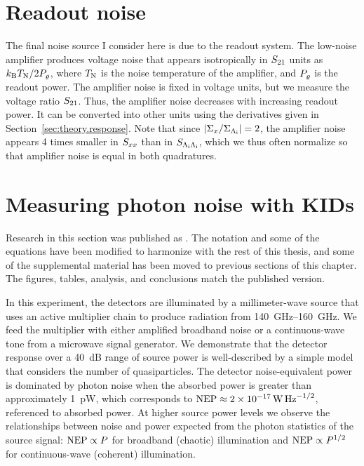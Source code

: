 \section{Readout noise}
\label{sec:sensitivity.readout}

The final noise source I consider here is due to the readout system.
The low-noise amplifier produces voltage noise that appears isotropically in $S_{21}$ units as
$k_\mathrm{B} T_\mathrm{N} / 2 P_\varrho$,
where $T_\mathrm{N}$ is the noise temperature of the amplifier, and $P_\varrho$ is the readout power.
The amplifier noise is fixed in voltage units, but we measure the voltage ratio $S_{21}$.
Thus, the amplifier noise decreases with increasing readout power.
It can be converted into other units using the derivatives given in Section~\ref{sec:theory.response}.
Note that since $|\Sigma_x / \Sigma_{\Lambda_{\mathrm{i}}}| = 2$, the amplifier noise appears 4 times smaller in $S_{x x}$ than in $S_{\Lambda_{\mathrm{i}} \Lambda_{\mathrm{i}}}$, which we thus often normalize so that amplifier noise is equal in both quadratures.


\section{Measuring photon noise with KIDs}
\label{sec:sensitivity.measuring}

Research in this section was published as .
The notation and some of the equations have been modified to harmonize with the rest of this thesis, and some of the supplemental material has been moved to previous sections of this chapter.
The figures, tables, analysis, and conclusions match the published version.

In this experiment, the detectors are illuminated by a millimeter-wave source that uses an active multiplier chain to produce radiation from \SIrange{140}{160}{GHz}.
We feed the multiplier with either amplified broadband noise or a continuous-wave tone from a microwave signal generator.
We demonstrate that the detector response over a \SI{40}{dB} range of source power is well-described by a simple model that considers the number of quasiparticles.
The detector noise-equivalent power is dominated by photon noise when the absorbed power is greater than approximately \SI{1}{pW}, which corresponds to
$\mathrm{NEP} \approx \SI{2e-17}{W.Hz^{-1/2}}$,
referenced to absorbed power.
At higher source power levels we observe the relationships between noise and power expected from the photon statistics of the source signal: $\mathrm{NEP} \propto P$ for broadband (chaotic) illumination and $\mathrm{NEP} \propto P^{1/2}$ for continuous-wave (coherent) illumination.


